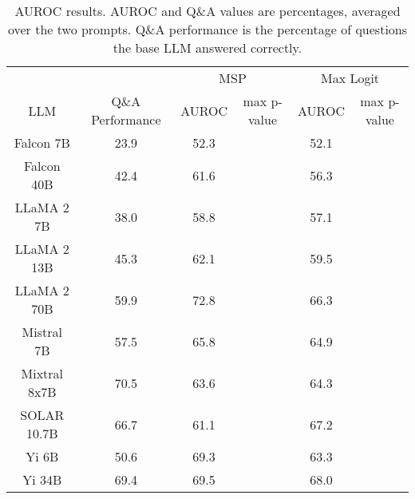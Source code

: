 \begin{table*}
\centering
\begin{tabular}{c|c|c|c|c|c}
& & \multicolumn{2}{c|}{MSP} & \multicolumn{2}{c}{Max Logit} \\ 
LLM & Q\&A Performance & AUROC & max p-value & AUROC & max p-value\\ \hline
Falcon 7B & 23.9 & 52.3 &  & 52.1 & \\
Falcon 40B & 42.4 & 61.6 &  & 56.3 & \\
LLaMA 2 7B & 38.0 & 58.8 &  & 57.1 & \\
LLaMA 2 13B & 45.3 & 62.1 &  & 59.5 & \\
LLaMA 2 70B & 59.9 & 72.8 &  & 66.3 & \\
Mistral 7B & 57.5 & 65.8 &  & 64.9 & \\
Mixtral 8x7B & 70.5 & 63.6 &  & 64.3 & \\
SOLAR 10.7B & 66.7 & 61.1 &  & 67.2 & \\
Yi 6B & 50.6 & 69.3 &  & 63.3 & \\
Yi 34B & 69.4 & 69.5 &  & 68.0 & \\
\hline
\end{tabular}
\caption{AUROC results. AUROC and Q\&A values are percentages, averaged over the two prompts. Q\&A performance is the percentage of questions the base LLM answered correctly.}
\label{tab:auroc}
\end{table*}
